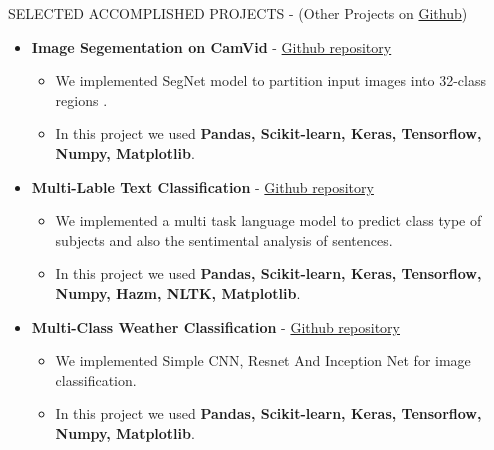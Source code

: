 \documentclass[]{CV}
\begin{document}
\begin{section}{SELECTED ACCOMPLISHED PROJECTS { - (Other Projects on \href{https://github.com/amirkasaei}{Github})}}
\begin{itemize}
\item \textbf{Image Segementation on CamVid} - \href{https://github.com/amirkasaei/Image-Segementation-CamVid}{Github repository}
   \begin{itemize}
        \item We implemented SegNet model to partition input images into 32-class regions .\vspace{-2mm}
        \item In this project we used \textbf{Pandas, Scikit-learn, Keras, Tensorflow, Numpy, Matplotlib}.
    \end{itemize}
    \pagebreak
   \item \textbf{Multi-Lable Text Classification} - \href{https://github.com/amirkasaei/Multi-Lable-Text-Classification}{Github repository}
   \begin{itemize}
        \item We implemented a multi task language model to predict class type of subjects and also the sentimental analysis of sentences.\vspace{-2mm}
        \item In this project we used \textbf{Pandas, Scikit-learn, Keras, Tensorflow, Numpy, Hazm, NLTK, Matplotlib}.
    \end{itemize}
 \item \textbf{Multi-Class Weather Classification} - \href{https://github.com/amirkasaei/Multi-Class-Weather-Classification}{Github repository}
   \begin{itemize}
        \item We implemented Simple CNN, Resnet And Inception Net for image classification.\vspace{-2mm}
        \item In this project we used \textbf{Pandas, Scikit-learn, Keras, Tensorflow, Numpy, Matplotlib}.
    \end{itemize}

\end{itemize}
\end{section}
\end{document}
